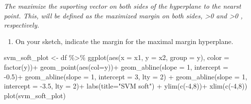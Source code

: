 \documentclass[
  letterpaper,
  DIV=11,
  numbers=noendperiod]{scrartcl}
\newenvironment{Shaded}{\begin{snugshade}}{\end{snugshade}}
\newcommand{\AttributeTok}[1]{\textcolor[rgb]{0.40,0.45,0.13}{#1}}
\newcommand{\DecValTok}[1]{\textcolor[rgb]{0.68,0.00,0.00}{#1}}
\newcommand{\FloatTok}[1]{\textcolor[rgb]{0.68,0.00,0.00}{#1}}
\newcommand{\FunctionTok}[1]{\textcolor[rgb]{0.28,0.35,0.67}{#1}}
\newcommand{\NormalTok}[1]{\textcolor[rgb]{0.00,0.23,0.31}{#1}}
\newcommand{\OtherTok}[1]{\textcolor[rgb]{0.00,0.23,0.31}{#1}}
\newcommand{\SpecialCharTok}[1]{\textcolor[rgb]{0.37,0.37,0.37}{#1}}
\newcommand{\StringTok}[1]{\textcolor[rgb]{0.13,0.47,0.30}{#1}}
\providecommand{\tightlist}{%
  \setlength{\itemsep}{0pt}\setlength{\parskip}{0pt}}\usepackage{longtable,booktabs,array}
\begin{document}
\emph{The maximize the suporting vector on both sides of the hyperplane
to the nearst point. This, will be defined as the maximized margin on
both sides, \textgreater0 and \textgreater0 , respectively.}

\begin{enumerate}
\def\labelenumi{(\alph{enumi})}
\setcounter{enumi}{3}
\tightlist
\item
  On your sketch, indicate the margin for the maximal margin hyperplane.
\end{enumerate}

\begin{Shaded}
\begin{Highlighting}[]
\NormalTok{svm\_soft\_plot }\OtherTok{\textless{}{-}}\NormalTok{ df }\SpecialCharTok{\%\textgreater{}\%} 
    \FunctionTok{ggplot}\NormalTok{(}\FunctionTok{aes}\NormalTok{(}\AttributeTok{x =}\NormalTok{ x1, }\AttributeTok{y =}\NormalTok{ x2, }\AttributeTok{group =}\NormalTok{ y), }\AttributeTok{color =} \FunctionTok{factor}\NormalTok{(y))}\SpecialCharTok{+}
    \FunctionTok{geom\_point}\NormalTok{(}\FunctionTok{aes}\NormalTok{(}\AttributeTok{col=}\NormalTok{y))}\SpecialCharTok{+}
    \FunctionTok{geom\_abline}\NormalTok{(}\AttributeTok{slope =} \DecValTok{1}\NormalTok{, }\AttributeTok{intercept =} \SpecialCharTok{{-}}\FloatTok{0.5}\NormalTok{)}\SpecialCharTok{+}
    \FunctionTok{geom\_abline}\NormalTok{(}\AttributeTok{slope =} \DecValTok{1}\NormalTok{, }\AttributeTok{intercept =} \DecValTok{3}\NormalTok{, }\AttributeTok{lty =} \DecValTok{2}\NormalTok{) }\SpecialCharTok{+}
    \FunctionTok{geom\_abline}\NormalTok{(}\AttributeTok{slope =} \DecValTok{1}\NormalTok{, }\AttributeTok{intercept =} \SpecialCharTok{{-}}\FloatTok{3.5}\NormalTok{, }\AttributeTok{lty =} \DecValTok{2}\NormalTok{)}\SpecialCharTok{+}
    \FunctionTok{labs}\NormalTok{(}\AttributeTok{title=}\StringTok{"SVM soft"}\NormalTok{) }\SpecialCharTok{+}
    \FunctionTok{ylim}\NormalTok{(}\FunctionTok{c}\NormalTok{(}\SpecialCharTok{{-}}\DecValTok{4}\NormalTok{,}\DecValTok{8}\NormalTok{))}\SpecialCharTok{+}
    \FunctionTok{xlim}\NormalTok{(}\FunctionTok{c}\NormalTok{(}\SpecialCharTok{{-}}\DecValTok{4}\NormalTok{,}\DecValTok{8}\NormalTok{))}
\FunctionTok{plot}\NormalTok{(svm\_soft\_plot)}
\end{Highlighting}
\end{Shaded}
\end{document}
